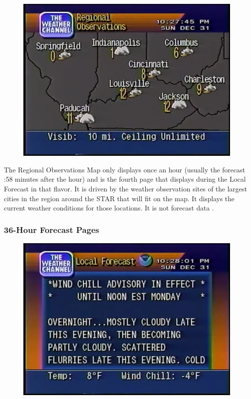 \documentclass[a4paper,11pt]{refart}
\begin{document}
\begin{figure}[ht!]\centering
\includegraphics[width=\textwidth]{img/reg-observ.png}
\end{figure}

The Regional Observations Map only displays once an hour (usually the forecast :58 minutes after the hour) and is the fourth page that displays during the Local Forecast in that flavor. It is driven by the weather observation sites of the largest cities in the region around the STAR that will fit on the map. It displays the current weather conditions for those locations. It is not forecast data \cite{WS4KProdGde}.

\subsubsection*{36-Hour Forecast Pages}

\begin{figure}[ht!]\centering
\includegraphics[width=\textwidth]{img/36hour.png}
\end{figure}
\end{document}
